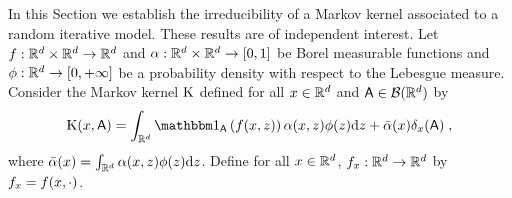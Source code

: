 
In this Section we establish the irreducibility of a Markov kernel associated to a random iterative model.
These results are of independent interest.
Let $f : \mathbb{R}^d \times \mathbb{R}^d \to \mathbb{R}^d$ and $\alpha: \mathbb{R}^d \times \mathbb{R}^d \to \left[0,1\right]$ be Borel measurable
functions and $\phi : \mathbb{R}^d \to \left[0,+\infty\right]$ be a
probability density with respect to the Lebesgue measure.  Consider the Markov kernel $\mathrm{K}$ defined for all $x \in \mathbb{R}^d$ and $\mathsf{A} \in \mathcal{B}(\mathbb{R}^d)$ by
\begin{equation}
\label{eq:def_pkerb}
  \Pkerb(x,\eventA) = \int_{\rset^d} \indi{\eventA}{\hfunb(x,z)} \alpha(x,z) \phib(z) \rmd z + \bar{\alpha}(x) \delta_x(\eventA) \eqsp,
\end{equation}
where $\bar{\alpha}(x)= \int_{\mathbb{R}^d} \alpha(x,z) \phi(z) \mathrm{d} z$. 
Define for all $x \in \mathbb{R}^d$, $f_x : \mathbb{R}^d \to \mathbb{R}^d$ by $f_x = f(x,\cdot)$.

